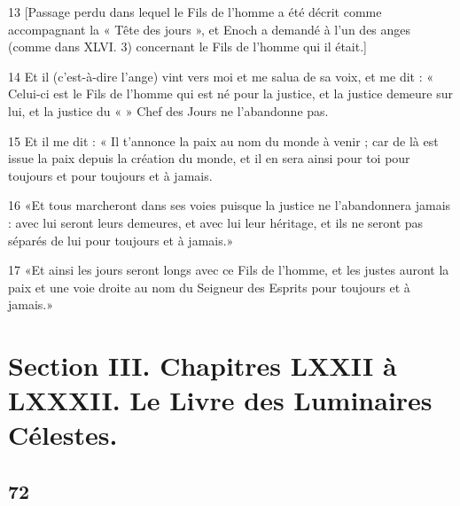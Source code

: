 \par 13 [Passage perdu dans lequel le Fils de l'homme a été décrit comme accompagnant la « Tête des jours », et Enoch a demandé à l'un des anges (comme dans XLVI. 3) concernant le Fils de l'homme qui il était.]
\par 14 Et il (c'est-à-dire l'ange) vint vers moi et me salua de sa voix, et me dit : « Celui-ci est le Fils de l'homme qui est né pour la justice, et la justice demeure sur lui, et la justice du « » Chef des Jours ne l’abandonne pas.
\par 15 Et il me dit : « Il t'annonce la paix au nom du monde à venir ; car de là est issue la paix depuis la création du monde, et il en sera ainsi pour toi pour toujours et pour toujours et à jamais.
\par 16 «Et tous marcheront dans ses voies puisque la justice ne l'abandonnera jamais : avec lui seront leurs demeures, et avec lui leur héritage, et ils ne seront pas séparés de lui pour toujours et à jamais.»
\par 17 «Et ainsi les jours seront longs avec ce Fils de l'homme, et les justes auront la paix et une voie droite au nom du Seigneur des Esprits pour toujours et à jamais.»

\part{Section III. Chapitres LXXII à LXXXII. Le Livre des Luminaires Célestes.}

\chapter{72}

